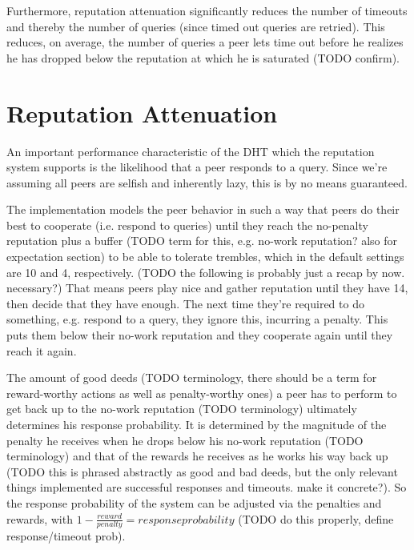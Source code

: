 Furthermore, reputation attenuation significantly reduces the number of timeouts
and thereby the number of queries (since timed out queries are retried). This
reduces, on average, the number of queries a peer lets time out before he
realizes he has dropped below the reputation at which he is saturated (TODO
confirm).

\section{Reputation Attenuation}
\label{sec:attenuation}
An important performance characteristic of the \ac{DHT} which the reputation
system supports is the likelihood that a peer responds to a query. Since we're
assuming all peers are selfish and inherently lazy, this is by no means
guaranteed.

The implementation models the peer behavior in such a way that peers do their
best to cooperate (i.e. respond to queries) until they reach the no-penalty
reputation plus a buffer (TODO term for this, e.g. no-work reputation? also for
expectation section) to be able to tolerate trembles, which in the default
settings are 10 and 4, respectively. (TODO the following is probably just a
recap by now. necessary?) That means peers play nice and gather reputation until
they have 14, then decide that they have enough. The next time they're required
to do something, e.g. respond to a query, they ignore this, incurring a penalty.
This puts them below their no-work reputation and they cooperate again until
they reach it again.

The amount of good deeds (TODO terminology, there should be a term for
reward-worthy actions as well as penalty-worthy ones) a peer has to perform to
get back up to the no-work reputation (TODO terminology) ultimately determines
his response probability. It is determined by the magnitude of the penalty he
receives when he drops below his no-work reputation (TODO terminology) and that
of the rewards he receives as he works his way back up (TODO this is phrased
abstractly as good and bad deeds, but the only relevant things implemented are
successful responses and timeouts. make it concrete?). So the response
probability of the system can be adjusted via the penalties and rewards, with $1
- \frac{reward}{penalty} = response probability$ (TODO do this properly, define
response/timeout prob).

